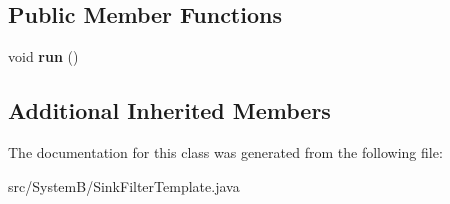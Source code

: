 \subsection*{Public Member Functions}
\begin{DoxyCompactItemize}
\item 
\hypertarget{class_system_b_1_1_sink_filter_template_a78eca49c7f215ae601ef095180c15aa1}{}void {\bfseries run} ()\label{class_system_b_1_1_sink_filter_template_a78eca49c7f215ae601ef095180c15aa1}

\end{DoxyCompactItemize}
\subsection*{Additional Inherited Members}


The documentation for this class was generated from the following file\+:\begin{DoxyCompactItemize}
\item 
src/\+System\+B/Sink\+Filter\+Template.\+java\end{DoxyCompactItemize}
